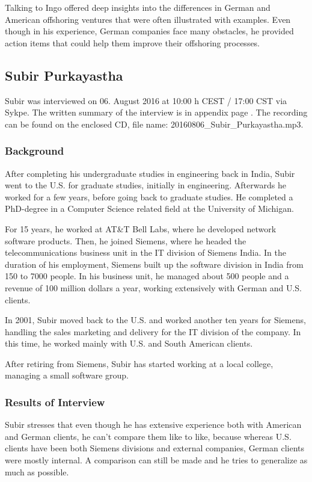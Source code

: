 Talking to Ingo offered deep insights into the differences in German and American offshoring ventures that were often illustrated with examples. Even though in his experience, German companies face many obstacles, he provided action items that could help them improve their offshoring processes.

\subsection{Subir Purkayastha}
Subir was interviewed on 06. August 2016 at 10:00 h CEST / 17:00 CST via Sykpe. The written summary of the interview is in appendix page \pageref{int:Subir}. The recording can be found on the enclosed CD, file name: 20160806\_Subir\_Purkayastha.mp3.

\subsubsection{Background}

After completing his undergraduate studies in engineering back in India, Subir went to the U.S. for graduate studies, initially in engineering. Afterwards he worked for a few years, before going back to graduate studies. He completed a PhD-degree in a Computer Science related field at the University of Michigan.

For 15 years, he worked at AT\&T Bell Labs, where he developed network software products. Then, he joined Siemens, where he headed the telecommunications business unit in the IT division of Siemens India. In the duration of his employment, Siemens built up the software division in India from 150 to 7000 people. In his business unit, he managed about 500 people and a revenue of 100 million dollars a year, working extensively with German and U.S. clients.

In 2001, Subir moved back to the U.S. and worked another ten years for Siemens, handling the sales marketing and delivery for the IT division of the company. In this time, he worked mainly with U.S. and South American clients.

After retiring from Siemens, Subir has started working at a local college, managing a small software group.

\subsubsection{Results of Interview}

Subir stresses that even though he has extensive experience both with American and German clients, he can't compare them like to like, because whereas U.S. clients have been both Siemens divisions and external companies, German clients were mostly internal. A comparison can still be made and he tries to generalize as much as possible.

